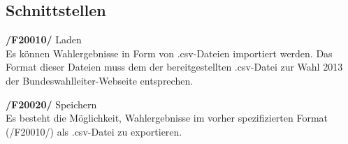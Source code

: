\documentclass[10pt,a4paper]{article}
\begin{document}
\subsection{Schnittstellen}
\begin{description}
	\item \textbf{/F20010/} Laden \hfill \\
	Es können Wahlergebnisse in Form von .csv-Dateien importiert werden. Das Format dieser Dateien muss dem der bereitgestellten .csv-Datei zur Wahl 2013 der Bundeswahlleiter-Webseite entsprechen.
	\item \textbf{/F20020/} Speichern \hfill \\
	Es besteht die Möglichkeit, Wahlergebnisse im vorher spezifizierten Format (/F20010/) als .csv-Datei zu exportieren.
\end{description}
\end{document}
